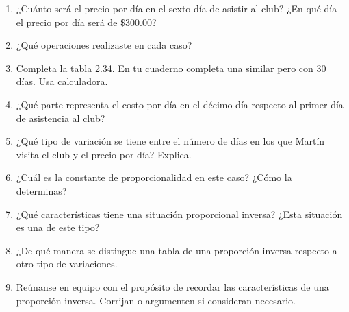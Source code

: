 \documentclass[11pt]{book}
\begin{document}
\begin{enumerate}
\begin{minipage}[t]{0.35\linewidth}
        \end{minipage}%
        \begin{minipage}[t]{0.65\linewidth}
          \begin{enumerate}
            \item ¿Cuánto será el precio por día en el sexto día de asistir al club? ¿En qué día el precio por día será
                  de \$300.00?
            \item ¿Qué operaciones realizaste en cada caso?
            \item Completa la tabla 2.34. En tu cuaderno completa una similar pero con 30 días. Usa calculadora.
            \item ¿Qué parte representa el costo por día en el décimo día respecto al primer día de asistencia al club?
            \item ¿Qué tipo de variación se tiene entre el número de días en los que Martín visita el club y el precio
                  por día? Explica.
            \item ¿Cuál es la constante de proporcionalidad en este caso? ¿Cómo la determinas?
            \item ¿Qué características tiene una situación proporcional inversa? ¿Esta situación es una de este tipo?
            \item ¿De qué manera se distingue una tabla de una proporción inversa respecto a otro tipo de variaciones.
            \item Reúnanse en equipo con el propósito de recordar las características de una proporción inversa.
                  Corrijan o argumenten si consideran necesario.
          \end{enumerate}
        \end{minipage}
\end{enumerate}

\newpage
\end{document}
